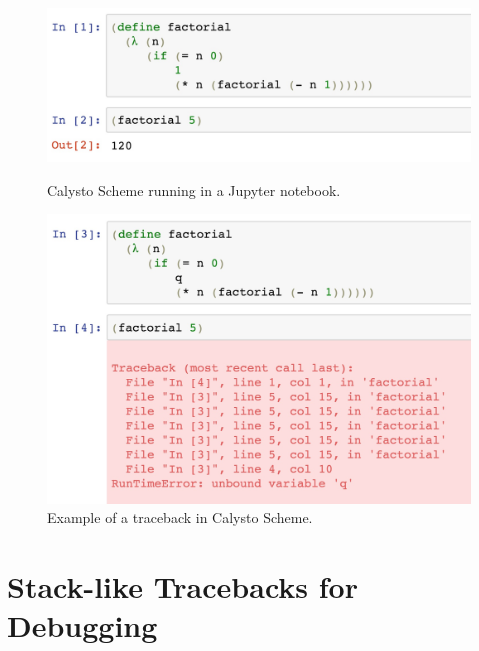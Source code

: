 \documentclass[acmsmall,screen,authorversion]{acmart}
\begin{document}

\begin{figure}
\begin{minipage}{0.47\textwidth}
  \includegraphics[width=\textwidth]{factorial1.jpg}
  \caption{Calysto Scheme running in a Jupyter notebook.}
  \label{fig:fact1}
\end{minipage}
\hspace{0.2in}
\begin{minipage}{0.47\textwidth}
  \includegraphics[width=\textwidth]{factorial2.jpg}
  \caption{Example of a traceback in Calysto Scheme.}
  \label{fig:fact2}
\end{minipage}
\end{figure}

\section{Stack-like Tracebacks for Debugging}
\end{document}
